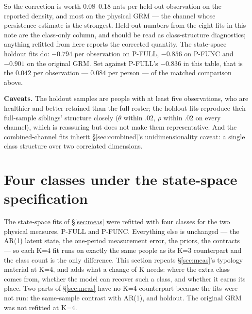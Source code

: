 \documentclass[11pt]{article}
\begin{document}
So the correction is worth $0.08$--$0.18$ nats per held-out observation on
the reported density, and most on the physical GRM --- the channel whose
persistence estimate is the strongest. Held-out numbers from the eight fits
in this note are the class-only column, and should be read as
class-structure diagnostics; anything refitted from here reports the
corrected quantity. The state-space holdout fits do: $-0.794$ per
observation on P-FULL, $-0.856$ on P-FUNC and $-0.901$ on the original GRM.
Set against P-FULL's $-0.836$ in this table, that is the $0.042$ per
observation --- $0.084$ per person --- of the matched comparison above.

\textbf{Caveats.} The holdout samples are people with at least five
observations, who are healthier and better-retained than the full roster;
the holdout fits reproduce their full-sample siblings' structure closely
($\theta$ within .02, $\rho$ within .02 on every channel), which is
reassuring but does not make them representative. And the combined-channel
fits inherit \S\ref{sec:combined}'s unidimensionality caveat: a single class
structure over two correlated dimensions.

\section{Four classes under the state-space specification}
\label{sec:k4}

The state-space fits of \S\ref{sec:meas} were refitted with four classes for
the two physical measures, P-FULL and P-FUNC. Everything else is unchanged ---
the AR(1) latent state, the one-period measurement error, the priors, the
contracts --- so each K=4 fit runs on exactly the same people as its K=3
counterpart and the class count is the only difference. This section repeats
\S\ref{sec:meas}'s typology material at K=4, and adds what a change of K
needs: where the extra class comes from, whether the model can recover such a
class, and whether it earns its place. Two parts of \S\ref{sec:meas} have no
K=4 counterpart because the fits were not run: the same-sample contrast with
AR(1), and holdout. The original GRM was not refitted at K=4.
\end{document}

